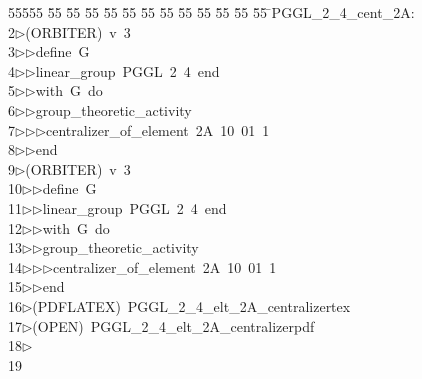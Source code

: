 %
%
\begin{tabbing}
55555 \= 55 \= 55 \= 55 \= 55 \= 55 \= 55 \= 55 \= 55 \= 55 \= 55 \= 55 \= 55 \= \>PGGL\_2\_4\_cent\_2A:\\[0pt]
2\>$\triangleright$\>(ORBITER)\ v\ 3\ \\[0pt]
3\>$\triangleright$\>$\triangleright$\>define\ G\ \\[0pt]
4\>$\triangleright$\>$\triangleright$\>linear\_group\ PGGL\ 2\ 4\ end\ \\[0pt]
5\>$\triangleright$\>$\triangleright$\>with\ G\ do\ \\[0pt]
6\>$\triangleright$\>$\triangleright$\>group\_theoretic\_activity\ \\[0pt]
7\>$\triangleright$\>$\triangleright$\>$\triangleright$\>centralizer\_of\_element\ 2A\ 10\ 01\ 1\ \\[0pt]
8\>$\triangleright$\>$\triangleright$\>end\\[0pt]
9\>$\triangleright$\>(ORBITER)\ v\ 3\ \\[0pt]
10\>$\triangleright$\>$\triangleright$\>define\ G\ \\[0pt]
11\>$\triangleright$\>$\triangleright$\>linear\_group\ PGGL\ 2\ 4\ end\ \\[0pt]
12\>$\triangleright$\>$\triangleright$\>with\ G\ do\ \\[0pt]
13\>$\triangleright$\>$\triangleright$\>group\_theoretic\_activity\ \\[0pt]
14\>$\triangleright$\>$\triangleright$\>$\triangleright$\>centralizer\_of\_element\ 2A\ 10\ 01\ 1\ \\[0pt]
15\>$\triangleright$\>$\triangleright$\>end\\[0pt]
16\>$\triangleright$\>(PDFLATEX)\ PGGL\_2\_4\_elt\_2A\_centralizertex\\[0pt]
17\>$\triangleright$\>(OPEN)\ PGGL\_2\_4\_elt\_2A\_centralizerpdf\\[0pt]
18\>$\triangleright$\>\\[0pt]
19\>\end{tabbing}

